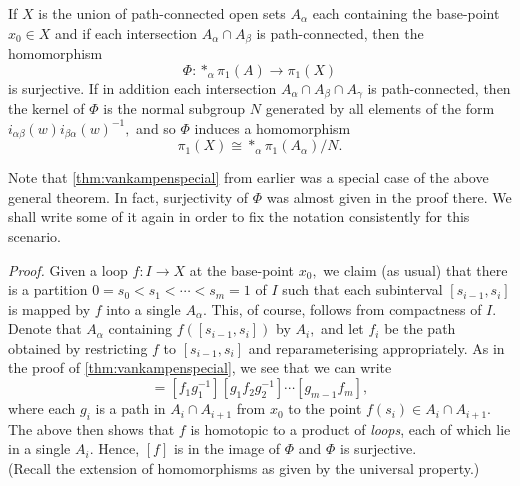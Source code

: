 \documentclass[12pt]{article}
\begin{document}
\begin{thm} \label{thm:vankampen}
	If $X$ is the union of path-connected open sets $A_\alpha$ each containing the base-point $x_0 \in X$ and if each intersection $A_\alpha \cap A_\beta$ is path-connected, then the homomorphism
	\begin{equation*} 
		\Phi:*_\alpha\pi_1(A) \to \pi_1(X)
	\end{equation*}
	is surjective. If in addition each intersection $A_\alpha\cap A_\beta\cap A_\gamma$ is path-connected, then the kernel of $\Phi$ is the normal subgroup $N$ generated by all elements of the form $i_{\alpha\beta}(w)i_{\beta\alpha}(w)^{-1},$ and so $\Phi$ induces a homomorphism
	\begin{equation*} 
		\pi_1(X) \cong *_\alpha\pi_1(A_\alpha)/N.
	\end{equation*}
\end{thm}

Note that \cref{thm:vankampenspecial} from earlier was a special case of the above general theorem. In fact, surjectivity of $\Phi$ was almost given in the proof there. We shall write some of it again in order to fix the notation consistently for this scenario.

\emph{Proof.}
	Given a loop $f:I \to X$ at the base-point $x_0,$ we claim (as usual) that there is a partition $0 = s_0 < s_1 < \cdots < s_m = 1$ of $I$ such that each subinterval $[s_{i - 1}, s_i]$ is mapped by $f$ into a single $A_\alpha.$ This, of course, follows from compactness of $I.$\\
	Denote that $A_\alpha$ containing $f([s_{i - 1}, s_i])$ by $A_i,$ and let $f_i$ be the path obtained by restricting $f$ to $[s_{i-1}, s_i]$ and reparameterising appropriately. As in the proof of \cref{thm:vankampenspecial}, we see that we can write
	\begin{equation*} 
		[f] = [f_1g_1^{-1}][g_1f_2g_2^{-1}]\cdots[g_{m-1}f_m],
	\end{equation*}
	where each $g_i$ is a path in $A_i\cap A_{i+1}$ from $x_0$ to the point $f(s_i) \in A_i\cap A_{i+1}.$\\
	The above then shows that $f$ is homotopic to a product of \emph{loops}, each of which lie in a single $A_i.$ Hence, $[f]$ is in the image of $\Phi$ and $\Phi$ is surjective.\\
	(Recall the extension of homomorphisms as given by the universal property.)

	\dotfill
\end{document}
